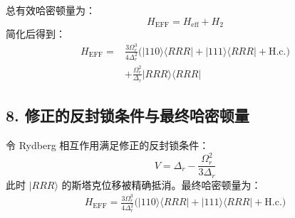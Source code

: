 \documentclass[12pt]{article}
\begin{document}
	总有效哈密顿量为：
	\begin{equation}
		H_{\text{EFF}} = H_{\text{eff}} + H_2
	\end{equation}
	简化后得到：
	\begin{equation}
		\begin{aligned}
			H_{\text{EFF}} = &\frac{3\Omega_r^3}{4\Delta_r^2} \big( |110\rangle\langle RRR| + |111\rangle\langle RRR| +\mathrm{H.c.} \big) \\
			&+ \frac{\Omega_r^2}{\Delta_r} |RRR\rangle\langle RRR|
		\end{aligned}
	\end{equation}
	
	\subsection*{8. 修正的反封锁条件与最终哈密顿量}
	令 Rydberg 相互作用满足修正的反封锁条件：
	\begin{equation}
		V = \Delta_r - \frac{\Omega_r^2}{3\Delta_r}
	\end{equation}
	此时 $|RRR\rangle$ 的斯塔克位移被精确抵消。最终哈密顿量为：
	\begin{equation}
		\begin{aligned}
			H_{\text{EFF}} = \frac{3\Omega_r^3}{4\Delta_r^2} \big( |110\rangle\langle RRR| + |111\rangle\langle RRR| +\mathrm{H.c.} \big)
		\end{aligned}
	\end{equation}
	
\end{document}
